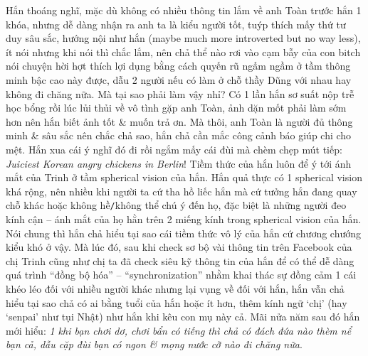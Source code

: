 \documentclass[12pt]{article}
\begin{document}
Hắn thoáng nghĩ, mặc dù không có nhiều thông tin lắm về anh Toàn trước hắn 1 khóa, nhưng dễ dàng nhận ra anh ta là kiểu người tốt, tuýp thích mấy thứ tư duy sâu sắc, hướng nội như hắn (maybe much more introverted but no way less), ít nói nhưng khi nói thì chắc lắm, nên chả thể nào rơi vào cạm bẫy của con bitch nói chuyện hời hợt thích lợi dụng bằng cách quyến rũ ngấm ngầm ở tầm thông minh bậc cao này được, dẫu 2 người nếu có làm ở chỗ thầy Dũng với nhau hay không đi chăng nữa. Mà tại sao phải làm vậy nhỉ? Có 1 lần hắn sơ suất nộp trễ học bổng rồi lúc lủi thủi về vô tình gặp anh Toàn, ảnh dặn mốt phải làm sớm hơn nên hắn biết ảnh tốt \& muốn trả ơn. Mà thôi, anh Toàn là người đủ thông minh \& sâu sắc nên chắc chả sao, hắn chả cần mắc công cảnh báo giúp chi cho mệt. Hắn xua cái ý nghĩ đó đi rồi ngắm mấy cái đùi mà chèm chẹp mút tiếp: {\it Juiciest Korean angry chickens in Berlin}! Tiềm thức của hắn luôn để ý tới ánh mắt của Trinh ở tầm spherical vision của hắn. Hắn quả thực có 1 spherical vision khá rộng, nên nhiều khi người ta cứ tha hồ liếc hắn mà cứ tưởng hắn đang quay chỗ khác hoặc không hề{\tt/}không thể chú ý đến họ, đặc biệt là những người đeo kính cận -- ánh mắt của họ hằn trên 2 miếng kính trong spherical vision của hắn. Nói chung thì hắn chả hiểu tại sao cái tiềm thức vô lý của hắn cứ chương chướng kiểu khó ở vậy. Mà lúc đó, sau khi check sơ bộ vài thông tin trên Facebook của chị Trinh cũng như chị ta đã check siêu kỹ thông tin của hắn để có thể dễ dàng quá trình ``đồng bộ hóa'' -- ``synchronization'' nhằm khai thác sự đồng cảm 1 cái khéo léo đối với nhiều người khác nhưng lại vụng về đối với hắn, hắn vẫn chả hiểu tại sao chả có ai bằng tuổi của hắn hoặc ít hơn, thêm kính ngữ `chị' (hay `senpai' như tụi Nhật) như hắn khi kêu con mụ này cả. Mãi nửa năm sau đó hắn mới hiểu: {\it 1 khi bạn chơi dơ, chơi bẩn có tiếng thì chả có đách đứa nào thèm nể bạn cả, dẫu cặp đùi bạn có ngon \& mọng nước cỡ nào đi chăng nữa}.
\end{document}
